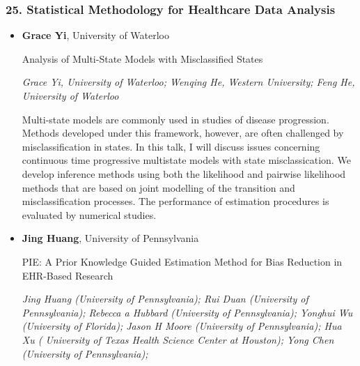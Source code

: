\subsubsection*{25. Statistical Methodology for Healthcare Data Analysis}

\begin{itemize}
\item \textbf{Grace Yi}, University of Waterloo

Analysis of Multi-State Models with Misclassified States

\emph{\footnotesize Grace Yi, University of Waterloo; Wenqing He, Western University; Feng He, University of Waterloo}

Multi-state models are commonly used in studies of disease progression. Methods developed under this framework, however, are often challenged by misclassification in states. In this talk, I will discuss issues concerning continuous time progressive multistate models with state misclassication. We develop inference methods using both the likelihood and pairwise likelihood methods that are based on joint modelling of the transition and misclassification processes. The performance of estimation procedures is evaluated by numerical studies.

\item \textbf{Jing Huang}, University of Pennsylvania

PIE: A Prior Knowledge Guided Estimation Method for Bias Reduction in EHR-Based Research

\emph{\footnotesize Jing Huang (University of Pennsylvania);  Rui Duan (University of Pennsylvania);  Rebecca a Hubbard (University of Pennsylvania);  Yonghui Wu (University of Florida); Jason H Moore (University of Pennsylvania); Hua Xu ( University of Texas Health Science Center at Houston);  Yong Chen (University of Pennsylvania);}


\end{itemize}
